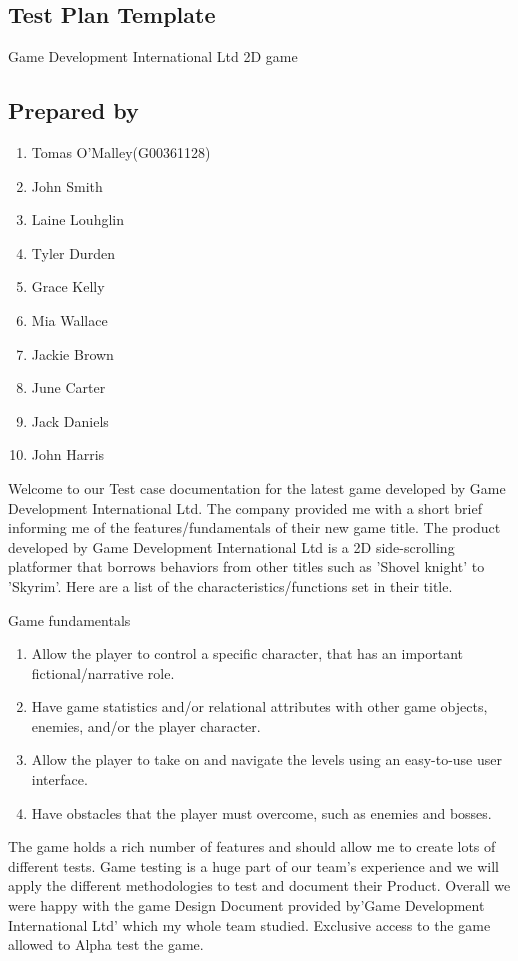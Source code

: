 
\subsection{Test Plan Template}
Game Development International Ltd 2D game 
\subsection{Prepared by }



\begin{multicols}{2}
\begin{enumerate}
  \item Tomas O'Malley(G00361128)
  	\item John Smith 
	\item Laine Louhglin 
	\item Tyler Durden 
	\item Grace Kelly 
	\item Mia Wallace
	\item Jackie Brown
	\item June  Carter 
	\item Jack Daniels
	\item John  Harris

\end{enumerate}
\end{multicols}

Welcome to our Test case documentation for the latest game developed by Game Development International Ltd.
The company provided me with a short brief informing me of the features/fundamentals of their new game title.
The product developed by  Game Development International Ltd is a 2D side-scrolling platformer that borrows
behaviors from other titles such as 'Shovel knight' to 'Skyrim'. Here are a list of the characteristics/functions
set in their title.


\centerline{Game fundamentals}

\begin{enumerate}
  \item Allow the player to control a specific character, that has an important
fictional/narrative role.
  \item Have game statistics and/or relational attributes with other game objects, enemies,
and/or the player character.

\item Allow the player to take on and navigate the levels using an easy-to-use user
interface.

\item Have obstacles that the player must overcome, such as enemies and bosses.
\end{enumerate}

The game holds a rich number of features and should allow me to create lots of different tests. Game testing is a huge part of our team's experience and we will apply the different methodologies to test and document their Product. Overall we were happy with the game Design Document provided by'Game Development International Ltd' which my whole team studied. Exclusive access to the game allowed to Alpha test the game.